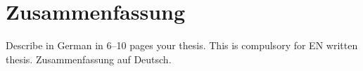 	\chapter*{Zusammenfassung}
\label{ch:abstractde}

Describe in German in 6--10 pages your thesis. This is compulsory for EN written thesis. Zusammenfassung auf Deutsch.